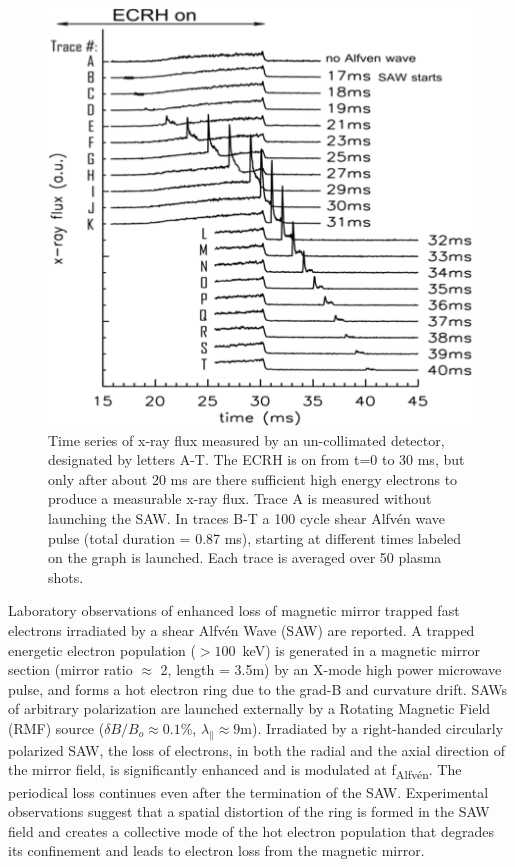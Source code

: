 \documentclass[11pt]{article}
\begin{document}
\begin{figure}
\begin{center}
\includegraphics[width=3.5truein]{muri1}
\caption{Time series of x-ray flux
measured by an un-collimated detector, designated by letters A-T. The
ECRH is on from t=0 to 30 ms, but only after about 20 ms are there
sufficient high energy electrons to produce a measurable x-ray flux.
Trace A is measured without launching the SAW. In traces B-T a 100 cycle
shear Alfvén wave pulse (total duration = 0.87 ms), starting at
different times labeled on the graph is launched. Each trace is averaged
over 50 plasma shots.}\label{muri1}
\end{center}
\end{figure}

Laboratory observations of enhanced loss of magnetic mirror trapped fast
electrons irradiated by a shear Alfv\'{e}n Wave (SAW) are reported. A
trapped energetic electron population ($> 100$~keV) is
generated in a magnetic mirror section (mirror ratio $\approx$ 2,
length = 3.5m) by an X-mode high power microwave pulse, and forms a hot electron
ring due to the grad-B and curvature drift. SAWs of arbitrary
polarization are launched externally by a Rotating Magnetic Field (RMF)
source ($\delta B/B_o \approx 0.1$\%, $\lambda_\parallel \approx 9$m).
Irradiated by a right-handed circularly polarized SAW, the loss of
electrons, in both the radial and the axial direction of the mirror
field, is significantly enhanced and is modulated at
f\textsubscript{Alfv\'{e}n}. The periodical loss continues even after the
termination of the SAW. Experimental observations suggest that a spatial
distortion of the ring is formed in the SAW field and creates a
collective mode of the hot electron population that degrades its
confinement and leads to electron loss from the magnetic mirror.
\end{document}
